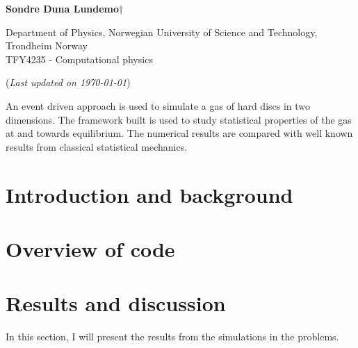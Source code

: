 


	
\begin{titlepage}
	\begin{center}
	\setlength{\parskip}{0em}
	\thispagestyle{titlepage}
	

	\vspace{4mm}
	
	\large{\textbf{Sondre Duna Lundemo}}$\dagger$
	
	\normalsize{Department of Physics, Norwegian University of Science and Technology, Trondheim Norway \\
	TFY4235 - Computational physics
	}

	(\textit{Last updated on \today})
	\end{center}

	\setlength{\parindent}{2em}An event driven approach is used to simulate a gas of hard discs in two dimensions. The framework built is used to study statistical properties of the gas at and towards equilibrium. The numerical results are compared with well known results from classical statistical mechanics. 
	
	

\end{titlepage}

\newpage
\setlength{\parskip}{0em}
\tableofcontents
\setlength{\parskip}{1em}
\newpage

\section{Introduction and background}\label{sec:intro}



\section{Overview of code}\label{sec:overview}



\newpage

\section{Results and discussion}

In this section, I will present the results from the simulations in the problems.

